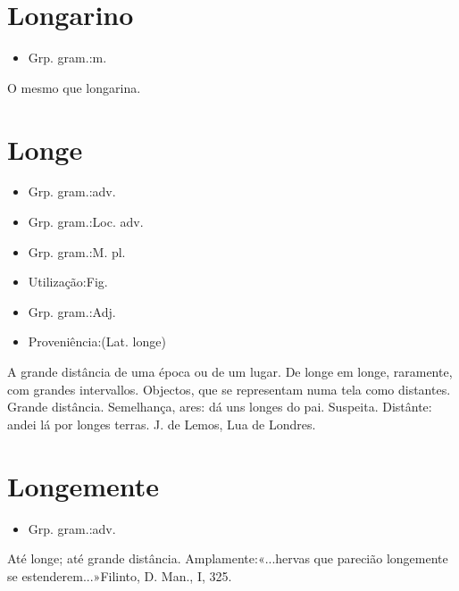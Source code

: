 \section{Longarino}
\begin{itemize}
\item {Grp. gram.:m.}
\end{itemize}
O mesmo que \textunderscore longarina\textunderscore .
\section{Longe}
\begin{itemize}
\item {Grp. gram.:adv.}
\end{itemize}
\begin{itemize}
\item {Grp. gram.:Loc. adv.}
\end{itemize}
\begin{itemize}
\item {Grp. gram.:M. pl.}
\end{itemize}
\begin{itemize}
\item {Utilização:Fig.}
\end{itemize}
\begin{itemize}
\item {Grp. gram.:Adj.}
\end{itemize}
\begin{itemize}
\item {Proveniência:(Lat. \textunderscore longe\textunderscore )}
\end{itemize}
A grande distância de uma época ou de um lugar.
\textunderscore De longe em longe\textunderscore , raramente, com grandes intervallos.
Objectos, que se representam numa tela como distantes.
Grande distância.
Semelhança, ares: \textunderscore dá uns longes do pai\textunderscore .
Suspeita.
Distânte: \textunderscore andei lá por longes terras\textunderscore . J. de Lemos, \textunderscore Lua de Londres\textunderscore .
\section{Longemente}
\begin{itemize}
\item {Grp. gram.:adv.}
\end{itemize}
Até longe; até grande distância.
Amplamente:«\textunderscore ...hervas que parecião longemente se estenderem...\textunderscore »Filinto, \textunderscore D. Man.\textunderscore , I, 325.
